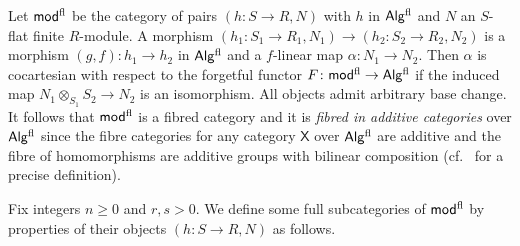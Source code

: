 \documentclass[a4paper,10pt]{amsart}
\theoremstyle{plain}
\theoremstyle{definition}
\theoremstyle{remark}
\numberwithin{equation}{xx}
\newcommand{\co}{\colon}
\newcommand{\ra}{\rightarrow}
\newcommand{\ot}{{\otimes}}
\newcommand{\Algf}{\cat{Alg}{}^{\textnormal{fl}}}
\newcommand{\modf}{\cat{mod}{}^{\textnormal{fl}}}
\renewcommand{\geq}{\geqslant}
\newcommand{\cat}[1]{\mathsf{{#1}}}
\begin{document}
Let \(\modf\) be the category of pairs \((h\co S\ra R,N)\) with \(h\) in \(\Algf\) and \(N\) an \(S\)-flat finite \(R\)-module. A morphism \((h_{1}\co S_{1}\ra R_{1},N_{1})\ra (h_{2}\co S_{2}\ra R_{2},N_{2})\) is a morphism \((g,f)\co h_{1}\ra h_{2}\) in \(\Algf\) and a \(f\)-linear map \(\alpha\co N_{1}\ra N_{2}\). Then \(\alpha\) is cocartesian with respect to the forgetful functor \(F\co \modf\ra \Algf\) if the induced map \(N_{1}\ot_{S_{1}} S_{2}\ra N_{2}\) is an isomorphism. All objects admit arbitrary base change. It follows that \(\modf\) is a fibred category and it is \emph{fibred in additive categories} over \(\Algf\) since the fibre categories for any category \(\cat{X}\) over \(\Algf\) are additive and the fibre of homomorphisms are additive groups with bilinear composition (cf.\ \cite[3.2]{ile:12a} for a precise definition).

Fix integers \(n\geq 0\) and \(r, s>0\). We define some full subcategories of \(\modf\) by properties of their objects \((h\co S\ra R,N)\) as follows.
\end{document}
